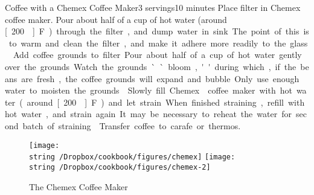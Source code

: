\begin{recipe}{Coffee with a Chemex\textsuperscript{\texttrademark} Coffee Maker}{3 servings}{10 minutes}
Place filter in Chemex\textsuperscript{\texttrademark} coffee maker.  Pour about half of a cup of hot water (around \unit[200\0]{F}) through the filter, and dump water in sink.  The point of this is to warm and clean the filter, and make it adhere more readily to the glass.
Add coffee grounds to filter.  Pour about half of a cup of hot water gently over the grounds.  Watch the grounds ``bloom,'' during which, if the beans are fresh, the coffee grounds will expand and bubble.  Only use enough water to moisten the grounds.
\newstep
Slowly fill Chemex\textsuperscript{\texttrademark} coffee maker with hot water (around \unit[200\0]{F}) and let strain.  When finished straining, refill with hot water, and strain again.  It may be necessary to reheat the water for second batch of straining.
\newstep
Transfer coffee to carafe or thermos.
\end{recipe}
\begin{figure}[b!]
\begin{center}
\texttt{[image: \\string~/Dropbox/cookbook/figures/chemex]}
\hspace{0.1\textwidth}
\texttt{[image: \\string~/Dropbox/cookbook/figures/chemex-2]}
\end{center}
\caption*{The Chemex\tm{} Coffee Maker}
\end{figure}
